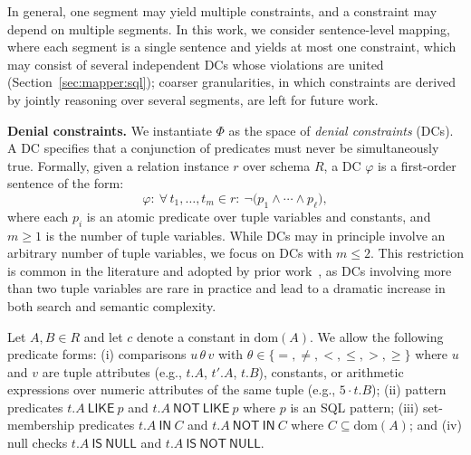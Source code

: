 
In general, one segment may yield multiple constraints, and a constraint may depend on multiple segments. In this work, we consider sentence-level mapping, where each segment is a single sentence and yields at most one constraint, which may consist of several independent DCs whose violations are united (Section~\ref{sec:mapper:sql}); coarser granularities, in which constraints are derived by jointly reasoning over several segments, are left for future work.


\smallskip\noindent\textbf{Denial constraints.}
We instantiate $\Phi$ as the space of \emph{denial constraints} (DCs). A DC specifies that a conjunction of predicates must never be simultaneously true. Formally, given a relation instance $r$ over schema $R$, a DC $\varphi$ is a first-order sentence of the form:
\[
\varphi:\ \forall\, t_1,\ldots,t_m \in r:\ \neg\big(p_1 \land \cdots \land p_\ell\big),
\]
where each $p_i$ is an atomic predicate over tuple variables and constants, and $m \ge 1$ is the number of tuple variables. While DCs may in principle involve an arbitrary number of tuple variables, we focus on DCs with $m \le 2$. This restriction is common in the literature and adopted by prior work~\cite{chu2013discovering,martin2025false, Pena2019DiscoveryDC}, as DCs involving more than two tuple variables are rare in practice and lead to a 
dramatic increase in both search and semantic complexity.


Let $A, B \in R$ and let $c$ denote a constant in $\mathrm{dom}(A)$. We allow the following predicate forms: (i) comparisons $u\,\theta\,v$ with $\theta \in \{=,\neq,<,\leq,>,\geq\}$ where $u$ and $v$ are tuple attributes (e.g., $t.A$, $t'.A$, $t.B$), constants, or arithmetic expressions over numeric attributes of the same tuple (e.g., $5 \cdot t.B$); (ii) pattern predicates $t.A\ \mathsf{LIKE}\ p$ and $t.A\ \mathsf{NOT\ LIKE}\ p$ where $p$ is an SQL pattern; (iii) set-membership predicates $t.A\ \mathsf{IN}\ C$ and $t.A\ \mathsf{NOT\ IN}\ C$ where $C \subseteq \mathrm{dom}(A)$; and
(iv) null checks $t.A\ \mathsf{IS\ NULL}$ and $t.A\ \mathsf{IS\ NOT\ NULL}$.


